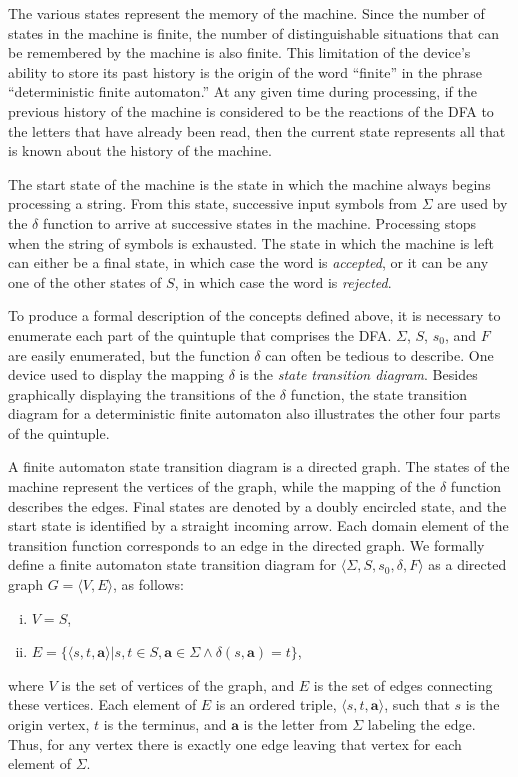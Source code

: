 The various states represent the memory of the machine. Since the number of
states in the machine is finite, the number of distinguishable situations that
can be remembered by the machine is also finite. This limitation of the device's
ability to store its past history is the origin of the word ``finite'' in the
phrase ``deterministic finite automaton.'' At any given time during processing,
if the previous history of the machine is considered to be the reactions of the
DFA to the letters that have already been read, then the current state
represents all that is known about the history of the machine.

The start state of the machine is the state in which the machine always begins
processing a string. From this state, successive input symbols from $\Sigma$ are
used by the $\delta$ function to arrive at successive states in the machine.
Processing stops when the string of symbols is exhausted. The state in which the
machine is left can either be a final state, in which case the word is
\emph{accepted}, or it can be any one of the other states of $S$, in which case
the word is \emph{rejected}.

To produce a formal description of the concepts defined above, it is necessary
to enumerate each part of the quintuple that comprises the DFA. $\Sigma$, $S$,
$s_0$, and $F$ are easily enumerated, but the function $\delta$ can often be
tedious to describe. One device used to display the mapping $\delta$ is the
\emph{state transition diagram}. Besides graphically displaying the transitions
of the $\delta$ function, the state transition diagram for a deterministic
finite automaton also illustrates the other four parts of the quintuple.

A finite automaton state transition diagram is a directed graph. The states of
the machine represent the vertices of the graph, while the mapping of the
$\delta$ function describes the edges. Final states are denoted by a doubly
encircled state, and the start state is identified by a straight incoming arrow.
Each domain element of the transition function corresponds to an edge in the
directed graph. We formally define a finite automaton state transition diagram
for $\langle\Sigma,S,s_0,\delta,F\rangle$ as a directed graph $G=\langle V,E
\rangle$, as follows:
\begin{enumerate}[i.]
\item $V=S$,
\item $E=\{\langle s,t,\pmb{a}\rangle | s,t\in S,\pmb{a}\in\Sigma\wedge\delta
	(s,\pmb{a})=t\}$,
\end{enumerate}
where $V$ is the set of vertices of the graph, and $E$ is the set of edges
connecting these vertices. Each element of $E$ is an ordered triple,
$\langle s,t,\pmb{a}\rangle$, such that $s$ is the origin vertex, $t$ is the
terminus, and $\pmb{a}$ is the letter from $\Sigma$ labeling the edge. Thus, for
any vertex there is exactly one edge leaving that vertex for each element of
$\Sigma$.

